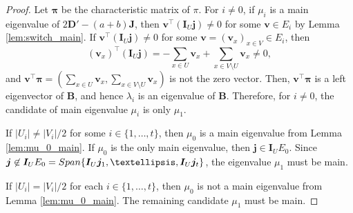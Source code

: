 \documentclass[10pt,a4paper]{amsart}
\newcommand{\B}{\boldsymbol{B}}
\newcommand{\D}{\boldsymbol{D}}
\newcommand{\I}{\boldsymbol{I}}
\newcommand{\J}{\boldsymbol{J}}
\newcommand{\jv}{\boldsymbol{j}}
\newcommand{\vv}{\boldsymbol{v}}
\begin{document}
\begin{proof}
Let $\boldsymbol{\pi}$ be the characteristic matrix of $\pi$.
For $i\ne 0$, if $\mu_i$ is a main eigenvalue of $2\D'-(a+b)\J$, then $\vv^\top (\I_U \jv) \ne 0$ for some $\vv \in E_i$ by Lemma \ref{lem:switch_main}. 
If $\vv^\top (\I_U \jv) \ne 0$ for some $\vv=(\vv_x)_{x \in V} \in E_i$, then 
\[
(\vv_x)^\top (\I_U \jv)= -\sum_{x \in U}\vv_x+\sum_{x \in V\setminus U} \vv_x \ne 0,
\]
and $\vv^\top  \boldsymbol{\pi}=(\sum_{x \in U} \vv_x,\sum_{x \in V \setminus U} \vv_x)$ is not the zero vector. 
Then, $\vv^\top  \boldsymbol{\pi}$ is a left eigenvector of $\B$, and hence $\lambda_i$ is an eigenvalue of $\B$. 
Therefore, for $i\ne 0$, the candidate of main eigenvalue $\mu_i$ is only $\mu_1$. 

If $|U_i|\ne |V_i|/2$ for some $i\in \{1,\ldots, t\}$, then $\mu_0$ is a main eigenvalue from Lemma \ref{lem:mu_0_main}. 
If $\mu_0$ is the only main eigenvalue, then $\jv \in \I_U E_0$.  
Since $\jv \not\in \I_U E_0={\rm Span}\{\I_U \jv_1, \ldots, \I_U \jv_t\}$, the eigenvalue $\mu_1$ must be main. 

If $|U_i|= |V_i|/2$ for each $i \in \{1, \ldots, t\}$, then $\mu_0$ is not a main eigenvalue from Lemma \ref{lem:mu_0_main}. The remaining candidate $\mu_1$ must be main. 
\end{proof}
\end{document}
